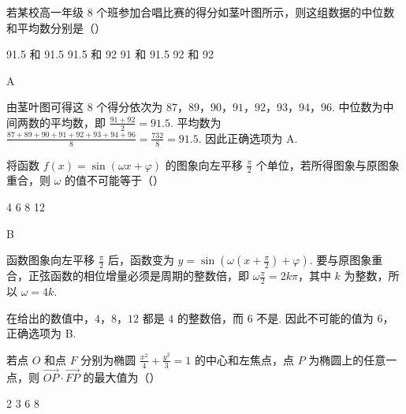 \begin{problem}
若某校高一年级 8 个班参加合唱比赛的得分如茎叶图所示，则这组数据的中位数和平均数分别是（\quad）



\choices
    {91.5 和 91.5}
    {91.5 和 92}
    {91 和 91.5}
    {92 和 92}
\end{problem}

\begin{answer}
A
\end{answer}

\begin{solution}
由茎叶图可得这 8 个得分依次为 \(87\)，\(89\)，\(90\)，\(91\)，\(92\)，\(93\)，\(94\)，\(96\). 中位数为中间两数的平均数，即
\(\frac{91+92}{2}=91.5\). 平均数为
\(\frac{87+89+90+91+92+93+94+96}{8}=\frac{732}{8}=91.5\). 因此正确选项为 A.
\end{solution}

\begin{problem}
将函数 \( f(x) = \sin (\omega x + \varphi) \) 的图象向左平移 \( \frac{\pi}{2} \) 个单位，若所得图象与原图象重合，则 \( \omega \) 的值不可能等于（\quad）

\choices
    {4}
    {6}
    {8}
    {12}
\end{problem}

\begin{answer}
B
\end{answer}

\begin{solution}
函数图象向左平移 \(\frac{\pi}{2}\) 后，函数变为
\(y=\sin\left(\omega\left(x+\frac{\pi}{2}\right)+\varphi\right)\). 要与原图象重合，正弦函数的相位增量必须是周期的整数倍，即
\(\omega\frac{\pi}{2}=2k\pi\)，其中 \(k\) 为整数，所以 \(\omega=4k\).

在给出的数值中，\(4\)，\(8\)，\(12\) 都是 \(4\) 的整数倍，而 \(6\) 不是. 因此不可能的值为 \(6\)，正确选项为 B.
\end{solution}

\begin{problem}
若点 \(O\) 和点 \(F\) 分别为椭圆 \(\frac{x^{2}}{4} + \frac{y^{2}}{3} = 1\) 的中心和左焦点，点 \(P\) 为椭圆上的任意一点，则 \(\overrightarrow{OP} \cdot \overrightarrow{FP}\) 的最大值为（\quad）

\choices
    {2}
    {3}
    {6}
    {8}
\end{problem}

